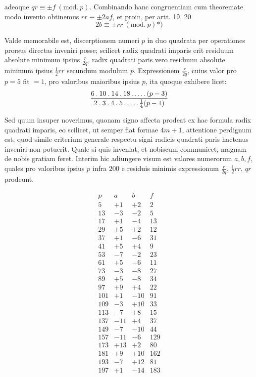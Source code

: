 %
adeoque $qr\equiv\pm f\ (\mathrm{mod.}\ p)$. Combinando hanc congruentiam cum theoremate modo invento obtinemus $rr\equiv\pm2af$, et proin, per artt. 19, 20
\[
2b\equiv\pm rr\ (\mathrm{mod.}\ p)\text{*)}
\]
\begingroup\renewcommand{\thefootnote}{*)}\endgroup

Valde memorabile est, discerptionem numeri $p$ in duo quadrata per operationes prorsus directas inveniri posse; scilicet radix quadrati imparis erit residuum absolute minimum ipsius $\frac r{2q}$, radix quadrati paris vero residuum absolute minimum ipsius $\frac12rr$ secundum modulum $p$. Expressionem $\frac r{2q}$, cuius valor pro $p=5$ fit $=1$, pro valoribus maioribus ipsius $p$, ita quoque exhibere licet:
\[
\frac{6\mathbin{.}10\mathbin{.}14\mathbin{.}18\mathinner{.\,.\,.\,.\,.}(p-3)}{2\mathbin{.}3\mathbin{.}4\mathbin{.}5\mathinner{.\,.\,.\,.\,.}\frac14(p-1)}
\]

Sed quum insuper noverimus, quonam signo affecta prodeat ex hac formula radix quadrati imparis, eo scilicet, ut semper fiat formae $4m+1$, attentione perdignum est, quod simile criterium generale respectu signi radicis quadrati paris hactenus inveniri non potuerit. Quale si quis inveniat, et nobiscum communicet, magnam de nobis gratiam feret. Interim hic adiungere visum est valores numerorum $a,b,f$, quales pro valoribus ipsius $p$ infra $200$ e residuis minimis expressionum $\frac r{2q}$, $\frac12rr$, $qr$ prodeunt.

%
\[
\begin{array}{r|r|r|r}
p&a&b&f\\\hline
5&+1&+2&2\\
13&-3&-2&5\\
17&+1&-4&13\\
29&+5&+2&12\\
37&+1&-6&31\\
41&+5&+4&9\\
53&-7&-2&23\\
61&+5&-6&11\\
73&-3&-8&27\\
89&+5&-8&34\\
97&+9&+4&22\\
101&+1&-10&91\\
109&-3&+10&33\\
113&-7&+8&15\\
137&-11&+4&37\\
149&-7&-10&44\\
157&-11&-6&129\\
173&+13&+2&80\\
181&+9&+10&162\\
193&-7&+12&81\\
197&+1&-14&183
\end{array}
\]

